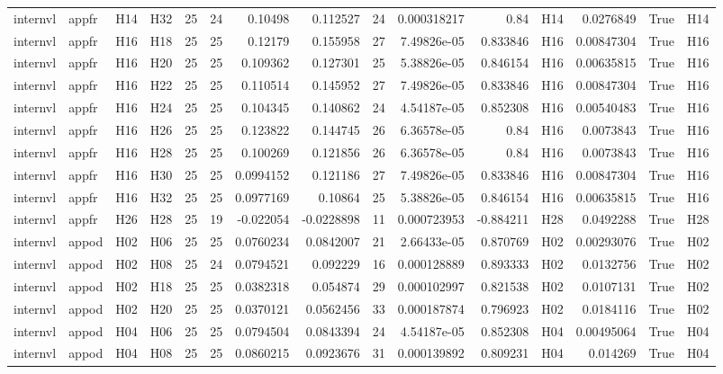 \begin{longtable}{llllrrrrrrrlrrl}
internvl & appfr & H14 & H32 & 25 & 24 & 0.10498 & 0.112527 & 24 & 0.000318217 & 0.84 & H14 & 0.0276849 & True & H14 \\
internvl & appfr & H16 & H18 & 25 & 25 & 0.12179 & 0.155958 & 27 & 7.49826e-05 & 0.833846 & H16 & 0.00847304 & True & H16 \\
internvl & appfr & H16 & H20 & 25 & 25 & 0.109362 & 0.127301 & 25 & 5.38826e-05 & 0.846154 & H16 & 0.00635815 & True & H16 \\
internvl & appfr & H16 & H22 & 25 & 25 & 0.110514 & 0.145952 & 27 & 7.49826e-05 & 0.833846 & H16 & 0.00847304 & True & H16 \\
internvl & appfr & H16 & H24 & 25 & 25 & 0.104345 & 0.140862 & 24 & 4.54187e-05 & 0.852308 & H16 & 0.00540483 & True & H16 \\
internvl & appfr & H16 & H26 & 25 & 25 & 0.123822 & 0.144745 & 26 & 6.36578e-05 & 0.84 & H16 & 0.0073843 & True & H16 \\
internvl & appfr & H16 & H28 & 25 & 25 & 0.100269 & 0.121856 & 26 & 6.36578e-05 & 0.84 & H16 & 0.0073843 & True & H16 \\
internvl & appfr & H16 & H30 & 25 & 25 & 0.0994152 & 0.121186 & 27 & 7.49826e-05 & 0.833846 & H16 & 0.00847304 & True & H16 \\
internvl & appfr & H16 & H32 & 25 & 25 & 0.0977169 & 0.10864 & 25 & 5.38826e-05 & 0.846154 & H16 & 0.00635815 & True & H16 \\
internvl & appfr & H26 & H28 & 25 & 19 & -0.022054 & -0.0228898 & 11 & 0.000723953 & -0.884211 & H28 & 0.0492288 & True & H28 \\
internvl & appod & H02 & H06 & 25 & 25 & 0.0760234 & 0.0842007 & 21 & 2.66433e-05 & 0.870769 & H02 & 0.00293076 & True & H02 \\
internvl & appod & H02 & H08 & 25 & 24 & 0.0794521 & 0.092229 & 16 & 0.000128889 & 0.893333 & H02 & 0.0132756 & True & H02 \\
internvl & appod & H02 & H18 & 25 & 25 & 0.0382318 & 0.054874 & 29 & 0.000102997 & 0.821538 & H02 & 0.0107131 & True & H02 \\
internvl & appod & H02 & H20 & 25 & 25 & 0.0370121 & 0.0562456 & 33 & 0.000187874 & 0.796923 & H02 & 0.0184116 & True & H02 \\
internvl & appod & H04 & H06 & 25 & 25 & 0.0794504 & 0.0843394 & 24 & 4.54187e-05 & 0.852308 & H04 & 0.00495064 & True & H04 \\
internvl & appod & H04 & H08 & 25 & 25 & 0.0860215 & 0.0923676 & 31 & 0.000139892 & 0.809231 & H04 & 0.014269 & True & H04 \\

\end{longtable}
